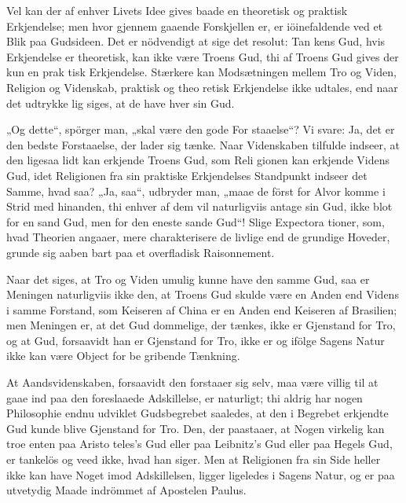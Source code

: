 \documentclass[12pt,a4paper]{article}
\newcommand{\opage}[1]{\marginnote{\footnotesize\textit{[#1]}}}
\begin{document}
Vel kan der af enhver Livets Idee gives baade en
theoretisk og praktisk Erkjendelse; men hvor gjennem\-%
\opage{73}gaaende Forskjellen er, er iöinefaldende ved et Blik paa
Gudsideen. Det er nödvendigt at sige det resolut: Tan\-%
kens Gud, hvis Erkjendelse er theoretisk, kan ikke være
Troens Gud, thi af Troens Gud gives der kun en prak\-%
tisk Erkjendelse. Stærkere kan Modsætningen mellem
Tro og Viden, Religion og Videnskab, praktisk og theo\-%
retisk Erkjendelse ikke udtales, end naar det udtrykke\-%
lig siges, at de have hver sin Gud.

„Og dette“, spörger man, „skal være den gode For\-%
staaelse“? Vi svare: Ja, det er den bedste Forstaaelse,
der lader sig tænke. Naar Videnskaben tilfulde indseer,
at den ligesaa lidt kan erkjende Troens Gud, som Reli\-%
gionen kan erkjende Videns Gud, idet Religionen fra sin
praktiske Erkjendelses Standpunkt indseer det Samme,
hvad saa? „Ja, saa“, udbryder man, „maae de först for
Alvor komme i Strid med hinanden, thi enhver af dem
vil naturligviis antage sin Gud, ikke blot for en sand
Gud, men for den eneste sande Gud“! Slige Expectora\-%
tioner, som, hvad Theorien angaaer, mere charakterisere
de livlige end de grundige Hoveder, grunde sig aaben\-%
bart paa et overfladisk Raisonnement.

Naar det siges, at Tro og Viden umulig kunne have
den samme Gud, saa er Meningen naturligviis ikke den,
at Troens Gud skulde være en Anden end Videns i
samme Forstand, som Keiseren af China er en Anden
end Keiseren af Brasilien; men Meningen er, at det Gud\-%
dommelige, der tænkes, ikke er Gjenstand for Tro, og
at Gud, forsaavidt han er Gjenstand for Tro, ikke er
og ifölge Sagens Natur ikke kan være Object for be\-%
gribende Tænkning.

At Aandsvidenskaben, forsaavidt den forstaaer sig
selv, maa være villig til at gaae ind paa den foreslaaede
Adskillelse, er naturligt; thi aldrig har nogen Philosophie
endnu udviklet Gudsbegrebet saaledes, at den i Begrebet
erkjendte Gud kunde blive Gjenstand for Tro. Den, der
paastaaer, at Nogen virkelig kan troe enten paa Aristo\-%
\opage{74}teles's Gud eller paa Leibnitz's Gud eller paa Hegels
Gud, er tankelös og veed ikke, hvad han siger. Men
at Religionen fra sin Side heller ikke kan have Noget imod
Adskillelsen, ligger ligeledes i Sagens Natur, og er paa
utvetydig Maade indrömmet af Apostelen Paulus.
\end{document}
